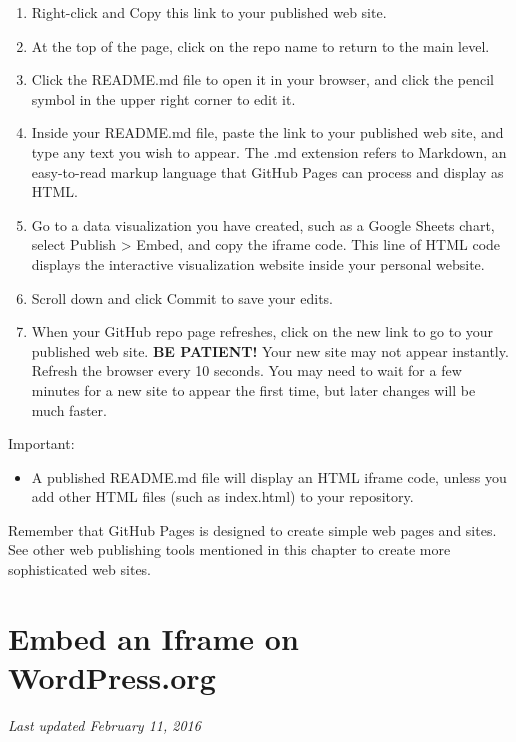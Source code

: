 \documentclass[
  english,
]{book}
\providecommand{\tightlist}{%
  \setlength{\itemsep}{0pt}\setlength{\parskip}{0pt}}
\begin{document}
\begin{enumerate}
\def\labelenumi{\arabic{enumi})}
\setcounter{enumi}{6}
\item
  Right-click and Copy this link to your published web site.
\item
  At the top of the page, click on the repo name to return to the main level.
\item
  Click the README.md file to open it in your browser, and click the pencil symbol in the upper right corner to edit it.
\item
  Inside your README.md file, paste the link to your published web site, and type any text you wish to appear. The .md extension refers to Markdown, an easy-to-read markup language that GitHub Pages can process and display as HTML.
\item
  Go to a data visualization you have created, such as a Google Sheets chart, select Publish \textgreater{} Embed, and copy the iframe code. This line of HTML code displays the interactive visualization website inside your personal website.
\item
  Scroll down and click Commit to save your edits.
\item
  When your GitHub repo page refreshes, click on the new link to go to your published web site.
  \textbf{BE PATIENT!} Your new site may not appear instantly. Refresh the browser every 10 seconds. You may need to wait for a few minutes for a new site to appear the first time, but later changes will be much faster.
\end{enumerate}

Important:

\begin{itemize}
\tightlist
\item
  A published README.md file will display an HTML iframe code, unless you add other HTML files (such as index.html) to your repository.
\end{itemize}

Remember that GitHub Pages is designed to create simple web pages and sites. See other web publishing tools mentioned in this chapter to create more sophisticated web sites.

\hypertarget{iframe-wordpress}{%
\section{Embed an Iframe on WordPress.org}\label{iframe-wordpress}}

\emph{Last updated February 11, 2016}
\end{document}
